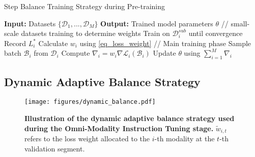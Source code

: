 


\begin{algorithm}[t]
\caption{Step Balance Training Strategy during Pre-training}
\label{alg:step_balance}
\begin{algorithmic}[1]
\State \textbf{Input:} Datasets $\{\mathcal{D}_1, ..., \mathcal{D}_M\}$
\State \textbf{Output:} Trained model parameters $\theta$
\State // small-scale datasets training to determine weights
    \State Train on $\mathcal{D}_i^{sub}$ until convergence
    \State Record $L_i^*$
    \State Calculate $w_i$ using \cref{eq_loss_weight}
\EndFor
\State // Main training phase
        \State Sample batch $\mathcal{B}_i$ from $\mathcal{D}_i$
        \State Compute $\nabla_i = w_i\nabla\mathcal{L}_i(\mathcal{B}_i)$
    \EndFor
    \State Update $\theta$ using $\sum_{i=1}^M \nabla_i$
\EndWhile
\end{algorithmic}
\end{algorithm}



\subsection{\textbf{Dynamic Adaptive Balance Strategy}}\label{subsubsec-Dynamic Adaptive Balance}

\begin{figure}[t]
    \centering
    \texttt{[image: figures/dynamic\_balance.pdf]}
    \caption{
    \textbf{Illustration of the dynamic adaptive balance strategy used during the Omni-Modality Instruction Tuning stage.}
    $\widetilde{w}_{i, t}$ refers to the loss weight allocated to the $i$-th modality at the $t$-th validation segment.
    }
    \label{fig-multi_modal_balance}
\end{figure}


